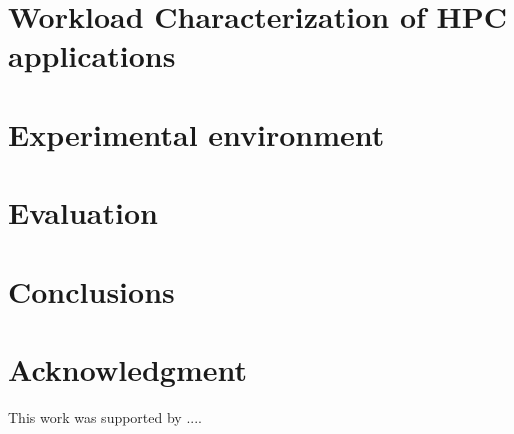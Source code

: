 \documentclass[format=sigconf, review=false, anonymous=false]{acmart}
\begin{document}
\section{Workload Characterization of HPC applications}
\label{sec:workload}
  

\section{Experimental environment}
\label{sec:Experimental}


\section{Evaluation}
\label{sec:evaluation}


% 

\section{Conclusions}
\label{sec:Conclusions}
 

\section{Acknowledgment}

This work was supported by ....


%

%
%
%
%
 
\end{document}
